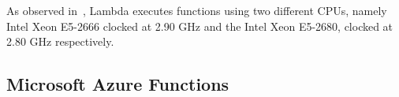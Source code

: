 As observed in~\cite{216063}, Lambda executes functions using two different \gls{CPU}s, namely Intel Xeon E5-2666 clocked at 2.90 \gls{GHz}  and the Intel Xeon E5-2680, clocked at 2.80 \gls{GHz} respectively. 

\subsection{Microsoft Azure Functions}

